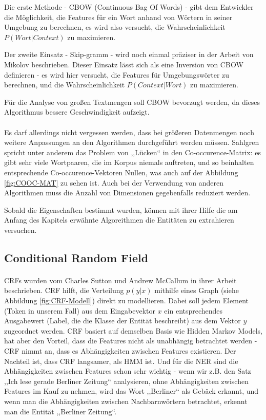 Die erste Methode - CBOW (Continuous Bag Of Words\cite{garcia2014word}) - gibt dem Entwickler die Möglichkeit, die Features für ein Wort anhand von Wörtern in seiner Umgebung zu berechnen, es wird also versucht, die Wahrscheinlichkeit $P(Wort|Context)$ zu maximieren.

Der zweite Einsatz - Skip-gramm - wird noch einmal präziser in der Arbeit von Mikolov\cite{mikolov2013distributed} beschrieben. Dieser Einsatz lässt sich als eine Inversion von CBOW  definieren - es wird hier versucht, die Features für Umgebungswörter zu berechnen, und die Wahrscheinlichkeit $P(Context|Wort)$ zu maximieren.

Für die Analyse von großen Textmengen soll CBOW bevorzugt werden, da dieses Algorithmus bessere Geschwindigkeit aufzeigt\cite{wang2014introduction}. 

\paragraph{}
Es darf allerdings nicht vergessen werden, dass bei größeren Datenmengen noch weitere Anpassungen an den Algorithmen durchgeführt werden müssen. Sahlgren\cite{sahlgren2006word} spricht unter anderem das Problem von ,,Lücken`` in den Co-occurence-Matrix: es gibt sehr viele Wortpaaren, die im Korpus niemals auftreten, und so beinhalten entsprechende Co-occurence-Vektoren Nullen, was auch auf der Abbildung \ref{fig:COOC-MAT} zu sehen ist. Auch bei der Verwendung von anderen Algorithmen muss die Anzahl von Dimensionen gegebenfalls reduziert werden.  

Sobald die Eigenschaften bestimmt wurden, können mit ihrer Hilfe die am Anfang des Kapitels erwähnte Algoreithmen die Entitäten zu extrahieren versuchen.

\subsection{Conditional Random Field}
\paragraph{}
CRFs wurden vom Charles Sutton und Andrew McCallum in ihrer Arbeit\cite{Charles/Andrew:10} beschrieben. CRF hilft, die Verteilung $p(y|x)$ mithilfe eines Graph (siehe Abbildung \ref{fig:CRF-Modell}) direkt zu modellieren. Dabei soll jedem Element (Token in unserem Fall) aus dem Eingabevektor $x$ ein entsprechendes Ausgabewert (Label, die die Klasse der Entität beschreibt) aus dem Vektor $y$ zugeordnet werden. CRF basiert auf demselben Basis wie Hidden Markov Models, hat aber den Vorteil, dass die Features nicht als unabhängig betrachtet werden - CRF nimmt an, dass es Abhängigkeiten zwischen Features existieren. Der Nachteil ist, dass CRF langsamer, als HMM ist. Und für die NER sind die Abhängigkeiten zwischen Features schon sehr wichtig - wenn wir z.B. den Satz ,,Ich lese gerade Berliner Zeitung`` analysieren, ohne Abhängigkeiten zwischen Features im Kauf zu nehmen, wird das Wort ,,Berliner`` als Gebäck erkannt, und wenn man die Abhängigkeiten zwischen Nachbarnwörtern betrachtet, erkennt man die Entität ,,Berliner Zeitung``.

